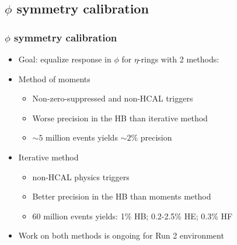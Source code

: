 \documentclass[bigger]{beamer}
\begin{document}
\subsection{$\phi$ symmetry calibration}
\label{sec-2-3}
\begin{frame}
\frametitle{$\phi$ symmetry calibration}
\label{sec-2-3-1}
\begin{itemize}

\item Goal: equalize response in $\phi$ for $\eta$-rings with 2 methods:
\label{sec-2-3-1-1}%

\item Method of moments
\label{sec-2-3-1-2}%
\begin{itemize}

\item Non-zero-suppressed and non-HCAL triggers
\label{sec-2-3-1-2-1}%

\item Worse precision in the HB than iterative method
\label{sec-2-3-1-2-2}%

\item $\sim5$ million events yields $\sim2\%$ precision
\label{sec-2-3-1-2-3}%
\end{itemize} %

\item Iterative method
\label{sec-2-3-1-3}%
\begin{itemize}

\item non-HCAL physics triggers
\label{sec-2-3-1-3-1}%

\item Better precision in the HB than moments method
\label{sec-2-3-1-3-2}%

\item 60 million events yields: 1\% HB; 0.2-2.5\% HE; 0.3\% HF
\label{sec-2-3-1-3-3}%
\end{itemize} %

\item Work on both methods is ongoing for Run 2 environment
\label{sec-2-3-1-4}%
\end{itemize} %
\end{frame}
\end{document}
